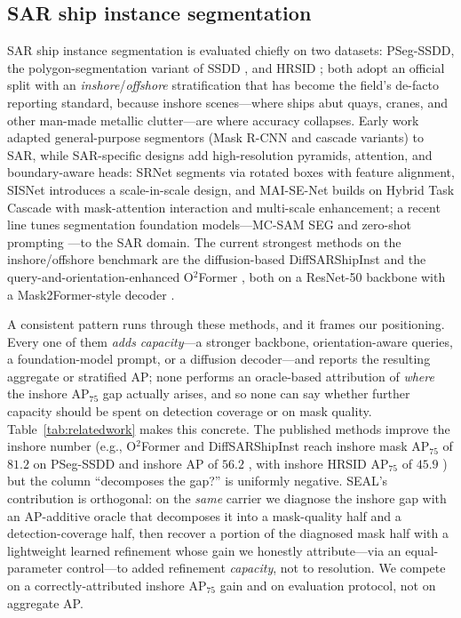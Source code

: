 \documentclass[journal]{IEEEtran}
\begin{document}
\subsection{SAR ship instance segmentation}
SAR ship instance segmentation is evaluated chiefly on two datasets: PSeg-SSDD, the polygon-segmentation variant of SSDD \cite{zhang2021ssdd}, and HRSID \cite{wei2020hrsid}; both adopt an official split with an \emph{inshore}/\emph{offshore} stratification that has become the field's de-facto reporting standard, because inshore scenes---where ships abut quays, cranes, and other man-made metallic clutter---are where accuracy collapses. Early work adapted general-purpose segmentors (Mask R-CNN and cascade variants) to SAR, while SAR-specific designs add high-resolution pyramids, attention, and boundary-aware heads: SRNet \cite{yang2023srnet} segments via rotated boxes with feature alignment, SISNet \cite{shao2023scaleinscale} introduces a scale-in-scale design, and MAI-SE-Net \cite{zhang2022maisenet} builds on Hybrid Task Cascade with mask-attention interaction and multi-scale enhancement; a recent line tunes segmentation foundation models---MC-SAM SEG \cite{zheng2024mcsamseg} and zero-shot prompting \cite{mansour2026zeroshot}---to the SAR domain. The current strongest methods on the inshore/offshore benchmark are the diffusion-based DiffSARShipInst \cite{xu2025diffsarshipinst} and the query-and-orientation-enhanced O$^2$Former \cite{gao2025o2former}, both on a ResNet-50 backbone with a Mask2Former-style decoder \cite{cheng2022mask2former}.

A consistent pattern runs through these methods, and it frames our positioning. Every one of them \emph{adds capacity}---a stronger backbone, orientation-aware queries, a foundation-model prompt, or a diffusion decoder---and reports the resulting aggregate or stratified AP; none performs an oracle-based attribution of \emph{where} the inshore AP$_{75}$ gap actually arises, and so none can say whether further capacity should be spent on detection coverage or on mask quality. Table~\ref{tab:relatedwork} makes this concrete. The published methods improve the inshore number (e.g., O$^2$Former and DiffSARShipInst reach inshore mask AP$_{75}$ of $81.2$ on PSeg-SSDD \cite{gao2025o2former} and inshore AP of $56.2$ \cite{xu2025diffsarshipinst}, with inshore HRSID AP$_{75}$ of $45.9$ \cite{gao2025o2former}) but the column ``decomposes the gap?'' is uniformly negative. SEAL's contribution is orthogonal: on the \emph{same} carrier we diagnose the inshore gap with an AP-additive oracle that decomposes it into a mask-quality half and a detection-coverage half, then recover a portion of the diagnosed mask half with a lightweight learned refinement whose gain we honestly attribute---via an equal-parameter control---to added refinement \emph{capacity}, not to resolution. We compete on a correctly-attributed inshore AP$_{75}$ gain and on evaluation protocol, not on aggregate AP.
\end{document}
